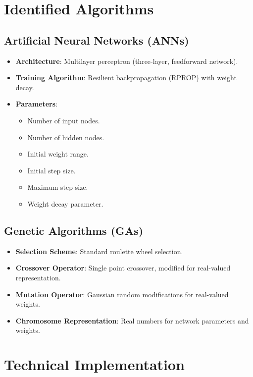\documentclass[12pt]{article}
\begin{document}
\section{Identified Algorithms}

\subsection{Artificial Neural Networks (ANNs)}
\begin{itemize}
    \item \textbf{Architecture}: Multilayer perceptron (three-layer, feedforward network).
    \item \textbf{Training Algorithm}: Resilient backpropagation (RPROP) with weight decay.
    \item \textbf{Parameters}:
    \begin{itemize}
        \item Number of input nodes.
        \item Number of hidden nodes.
        \item Initial weight range.
        \item Initial step size.
        \item Maximum step size.
        \item Weight decay parameter.
    \end{itemize}
\end{itemize}

\subsection{Genetic Algorithms (GAs)}
\begin{itemize}
    \item \textbf{Selection Scheme}: Standard roulette wheel selection.
    \item \textbf{Crossover Operator}: Single point crossover, modified for real-valued representation.
    \item \textbf{Mutation Operator}: Gaussian random modifications for real-valued weights.
    \item \textbf{Chromosome Representation}: Real numbers for network parameters and weights.
\end{itemize}

\section{Technical Implementation}
\end{document}
